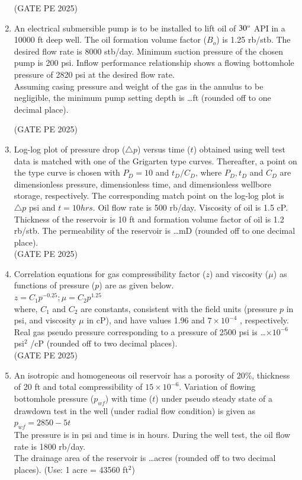 \documentclass[journal,12pt,onecolumn]{IEEEtran}
\theoremstyle{remark}
\begin{document}
\begin{enumerate}
\hfill{(GATE PE 2025)}

\item An electrical submersible pump is to be installed to lift oil of $30\degree$ API in a 10000 ft deep well. The oil formation volume factor ($B_o$) is 1.25 rb/stb. The desired flow rate
is 8000 stb/day. Minimum suction pressure of the chosen pump is 200 psi. Inflow performance relationship shows a flowing bottomhole pressure of 2820 psi at the desired flow rate.\\
Assuming casing pressure and weight of the gas in the annulus to be negligible, the minimum pump setting depth is \dots ft (rounded off to one decimal place).

\hfill{(GATE PE 2025)}


\item Log-log plot of pressure drop ($\triangle p$) versus time ($t$) obtained using well test data is matched with one of the Grigarten type curves. Thereafter, a point on the type curve
is chosen with $P_D=10$ and $t_D/C_D$, where $P_D,t_D$ and $C_D$ are dimensionless pressure, dimensionless time, and dimensionless wellbore storage, respectively. The corresponding match point on the log-log plot is $\triangle p$ psi and $t=10 hrs$. Oil flow rate is 500 rb/day. Viscosity of oil is 1.5 cP. Thickness of the reservoir is 10 ft and formation volume factor of oil is 1.2 rb/stb.
The permeability of the reservoir is \dots mD (rounded off to one decimal place).\\

\hfill{(GATE PE 2025)}


\item Correlation equations for gas compressibility factor ($z$) and viscosity ($\mu$) as functions of pressure ($p$) are as given below.\\
$z=C_1p^{-0.25};\mu=C_2p^{1.25}$\\
where, $C_1$ and $C_2$ are constants, consistent with the field units (pressure $p$ in psi, and viscosity $\mu$ in cP), and have values 1.96 and $7\times 10^{-4}$ , respectively.\\
Real gas pseudo pressure corresponding to a pressure of 2500 psi
is \dots$\times10^{-6}$ psi$^2$ /cP (rounded off to two decimal places).\\

\hfill{(GATE PE 2025)}


\item An isotropic and homogeneous oil reservoir has a porosity of 20\%, thickness of 20 ft and total compressibility of $15\times 10^{-6}$. Variation of flowing bottomhole pressure ($p_{wf}$) with time ($t$) under pseudo steady state of a drawdown test in the
well (under radial flow condition) is given as\\
$p_{wf}=2850-5t$\\
The pressure is in psi and time is in hours. During the well test, the oil flow rate is 1800 rb/day.\\
The drainage area of the reservoir is \dots acres (rounded off to two decimal places).
(Use: 1 acre = 43560 ft$^2$)


\end{enumerate}
\end{document}
